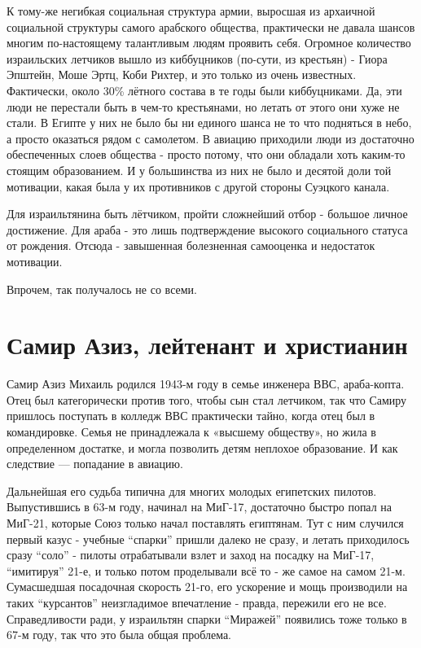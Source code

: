 К тому-же негибкая социальная структура армии, выросшая из архаичной социальной структуры самого арабского общества, практически не давала шансов многим по-настоящему талантливым людям проявить себя. Огромное количество израильских летчиков вышло из киббуцников (по-сути, из крестьян) - Гиора Эпштейн, Моше Эртц, Коби Рихтер, и это только из очень известных. Фактически, около 30\% лётного состава в те годы были киббуцниками. Да, эти люди не перестали быть в чем-то крестьянами, но летать от этого они хуже не стали. В Египте у них не было бы ни единого шанса не то что подняться в небо, а просто оказаться рядом с самолетом. В авиацию приходили люди из достаточно обеспеченных слоев общества - просто потому, что они обладали хоть каким-то стоящим образованием. И у большинства из них не было и десятой доли той мотивации, какая была у их противников с другой стороны Суэцкого канала.

Для израильтянина быть лётчиком, пройти сложнейший отбор - большое личное достижение. Для араба - это лишь подтверждение высокого социального статуса от рождения. Отсюда - завышенная болезненная самооценка и недостаток мотивации.

Впрочем, так получалось не со всеми.

\section{Самир Азиз, лейтенант и христианин}

Самир Азиз Михаиль родился 1943-м году в семье инженера ВВС, араба-копта. Отец был категорически против того, чтобы сын стал летчиком, так что Самиру пришлось поступать в колледж ВВС практически тайно, когда отец был в командировке. Семья не принадлежала к «высшему обществу», но жила в определенном достатке, и могла позволить детям неплохое образование. И как следствие — попадание в авиацию.

Дальнейшая его судьба типична для многих молодых египетских пилотов. Выпустившись в 63-м году, начинал на МиГ-17, достаточно быстро попал на МиГ-21, которые Союз только начал поставлять египтянам. Тут с ним случился первый казус - учебные “спарки” пришли далеко не сразу, и летать приходилось сразу “соло” - пилоты отрабатывали взлет и заход на посадку на МиГ-17, “имитируя” 21-е, и только потом проделывали всё то - же самое на самом 21-м. Сумасшедшая посадочная скорость 21-го, его ускорение и мощь производили на таких “курсантов” неизгладимое впечатление - правда, пережили его не все. Справедливости ради, у израильтян спарки “Миражей” появились тоже только в 67-м году, так что это была общая проблема.


